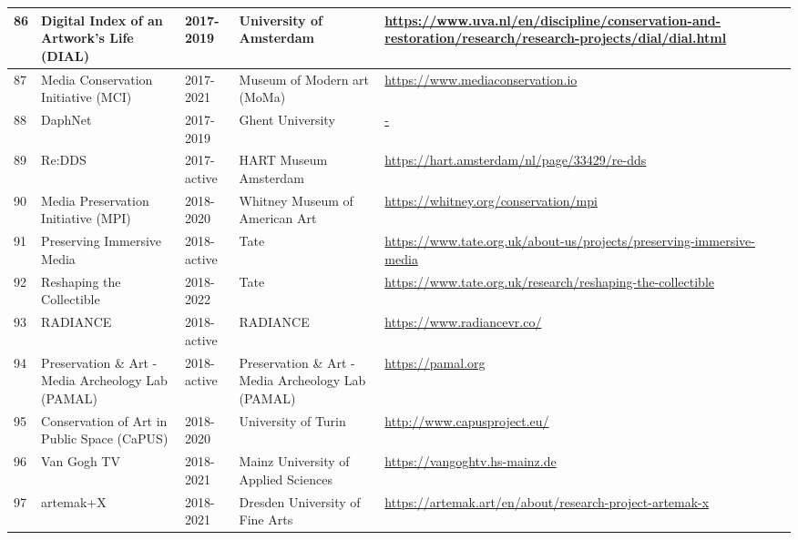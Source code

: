 \begin{longtable}{|p{}|p{}|p{}|p{}|p{}|}
    \scriptsize 86 & \scriptsize Digital Index of an Artwork's Life (DIAL) & \scriptsize 2017-2019 & \scriptsize University of Amsterdam & \scriptsize \url{https://www.uva.nl/en/discipline/conservation-and-restoration/research/research-projects/dial/dial.html } \\ \hline
    \scriptsize 87 & \scriptsize Media Conservation Initiative (MCI) & \scriptsize 2017-2021 & \scriptsize Museum of Modern art (MoMa) & \scriptsize \url{https://www.mediaconservation.io} \\ \hline
    \scriptsize 88 & \scriptsize DaphNet & \scriptsize 2017-2019 & \scriptsize Ghent University  & \scriptsize \url{-} \\ \hline
    \scriptsize 89 & \scriptsize Re:DDS & \scriptsize 2017-active & \scriptsize HART Museum Amsterdam & \scriptsize \url{https://hart.amsterdam/nl/page/33429/re-dds} \\ \hline
    \scriptsize 90 & \scriptsize Media Preservation Initiative (MPI) & \scriptsize 2018-2020 & \scriptsize Whitney Museum of American Art & \scriptsize \url{https://whitney.org/conservation/mpi} \\ \hline
    \scriptsize 91 & \scriptsize Preserving Immersive Media & \scriptsize 2018-active & \scriptsize Tate & \scriptsize \url{https://www.tate.org.uk/about-us/projects/preserving-immersive-media } \\ \hline
    \scriptsize 92 & \scriptsize Reshaping the Collectible & \scriptsize 2018-2022 & \scriptsize Tate & \scriptsize \url{https://www.tate.org.uk/research/reshaping-the-collectible } \\ \hline
    \scriptsize 93 & \scriptsize RADIANCE & \scriptsize 2018-active & \scriptsize RADIANCE & \scriptsize \url{https://www.radiancevr.co/ } \\ \hline
    \scriptsize 94 & \scriptsize Preservation \& Art - Media Archeology Lab (PAMAL) & \scriptsize 2018-active & \scriptsize Preservation \& Art - Media Archeology Lab (PAMAL) & \scriptsize \url{https://pamal.org } \\ \hline
    \scriptsize 95 & \scriptsize Conservation of Art in Public Space (CaPUS) & \scriptsize 2018-2020 & \scriptsize University of Turin & \scriptsize \url{http://www.capusproject.eu/} \\ \hline
    \scriptsize 96 & \scriptsize Van Gogh TV & \scriptsize 2018-2021 & \scriptsize Mainz University of Applied Sciences & \scriptsize \url{https://vangoghtv.hs-mainz.de} \\ \hline
    \scriptsize 97 & \scriptsize artemak+X & \scriptsize 2018-2021 & \scriptsize Dresden University of Fine Arts & \scriptsize \url{https://artemak.art/en/about/research-project-artemak-x} \\ \hline

\end{longtable}
